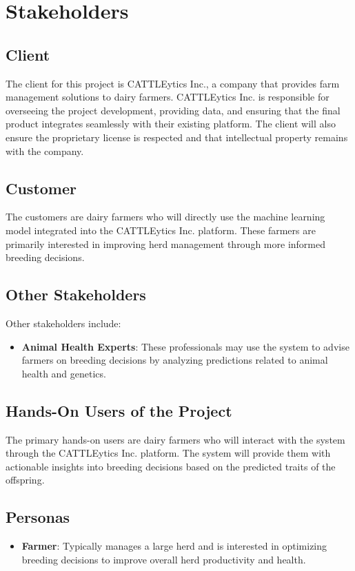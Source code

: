 \documentclass[12pt]{article}
\begin{document}
\section{Stakeholders}

\subsection{Client}
The client for this project is CATTLEytics Inc., a company that provides farm 
management solutions to dairy farmers. CATTLEytics Inc. is responsible for 
overseeing the project development, providing data, and ensuring that the final 
product integrates seamlessly with their existing platform. The client will 
also ensure the proprietary license is respected and that intellectual property 
remains with the company.

\subsection{Customer}
The customers are dairy farmers who will directly use the machine learning 
model integrated into the CATTLEytics Inc. platform. These farmers are 
primarily interested in improving herd management through more informed 
breeding decisions.

\subsection{Other Stakeholders}
Other stakeholders include:

\begin{itemize}
    \item \textbf{Animal Health Experts}: These professionals may use the 
    system to advise farmers on breeding decisions by analyzing predictions 
    related to animal health and genetics.
\end{itemize}

\subsection{Hands-On Users of the Project}
The primary hands-on users are dairy farmers who will interact with the system 
through the CATTLEytics Inc. platform. The system will provide them with 
actionable insights into breeding decisions based on the predicted traits of 
the offspring.

\subsection{Personas}
\begin{itemize}
    \item \textbf{Farmer}: Typically manages a large herd and is interested in 
    optimizing breeding decisions to improve overall herd productivity and 
    health.

\end{itemize}
\end{document}
